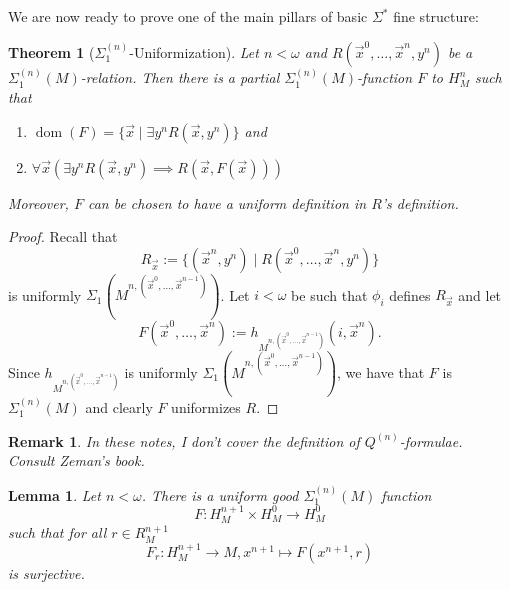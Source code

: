 \documentclass[12pt,a4paper]{article}
\theoremstyle{nicestyle}
\newtheorem{theorem}{Theorem}[subsection]
\newtheorem{lemma}{Lemma}[subsection]
\newtheorem{remark}{Remark}[subsection]
\DeclareMathOperator{\dom}{dom}
\begin{document}
We are now ready to prove one of the main pillars of basic
$\Sigma^{*}$ fine structure:

\begin{theorem}[$\Sigma^{(n)}_{1}$-Uniformization]
  Let $n < \omega$ and $R(\vec{x}^{0}, \ldots, \vec{x}^{n}, y^n)$ be a
  $\Sigma^{(n)}_1(M)$-relation. Then there is a partial
  $\Sigma^{(n)}_1(M)$-function $F$ to $H^n_M$ such that
  \begin{enumerate}
  \item $\dom(F) = \{ \vec{x} \mid \exists y^{n} R(\vec{x}, y^{n}) \}$ and
  \item
    $\forall \vec{x} ( \exists y^{n} R(\vec{x}, y^{n}) \implies
    R(\vec{x}, F(\vec{x})))$
  \end{enumerate}
  Moreover, $F$ can be chosen to have a uniform definition in $R$'s
  definition.
\end{theorem}

\begin{proof}
  Recall that
  \[
    R_{\vec{x}} := \{ (\vec{x}^{n}, y^{n}) \mid R(\vec{x}^{0}, \ldots,
    \vec{x}^{n}, y^{n}) \}
  \]
  is uniformly
  $\Sigma_1(M^{n, (\vec{x}^{0}, \ldots, \vec{x}^{n-1})})$. Let
  $i < \omega$ be such that $\phi_i$ defines $R_{\vec{x}}$ and let
  \[
    F(\vec{x}^{0}, \ldots, \vec{x}^{n}) := h_{M^{n, (\vec{x}^{0},
        \ldots, \vec{x}^{n-1})}}(i, \vec{x}^{n}).
  \]
  Since $h_{M^{n, (\vec{x}^{0}, \ldots, \vec{x}^{n-1})}}$ is uniformly
  $\Sigma_1(M^{n, (\vec{x}^{0}, \ldots, \vec{x}^{n-1})})$, we have
  that $F$ is $\Sigma^{(n)}_1(M)$ and clearly $F$ uniformizes $R$.
\end{proof}

\begin{remark}
  In these notes, I don't cover the definition of
  $Q^{(n)}$-formulae. Consult Zeman's book.
\end{remark}

\begin{lemma} \label{lemma:Skolem functions}
  Let $n < \omega$. There is a uniform good $\Sigma^{(n)}_{1}(M)$ function
  \[
    F \colon H^{n+1}_{M} \times H^{0}_{M} \to H^{0}_{M}
  \]
  such that for all $r \in R^{n+1}_{M}$
  \[
    F_{r} \colon H^{n+1}_{M} \to M, x^{n+1} \mapsto F(x^{n+1}, r)
  \]
  is surjective.
\end{lemma}
\end{document}
